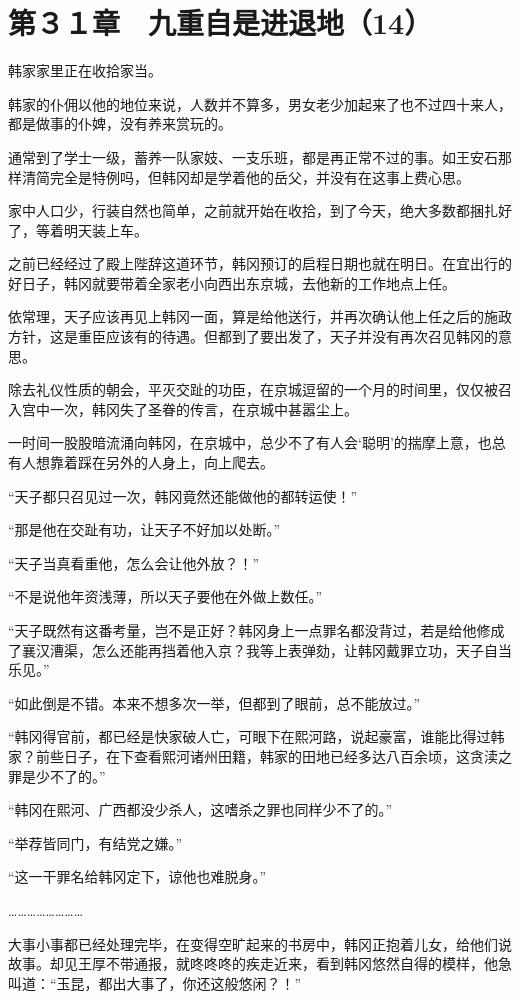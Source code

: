 \section{第３１章　九重自是进退地（14）}

韩家家里正在收拾家当。

韩家的仆佣以他的地位来说，人数并不算多，男女老少加起来了也不过四十来人，都是做事的仆婢，没有养来赏玩的。

通常到了学士一级，蓄养一队家妓、一支乐班，都是再正常不过的事。如王安石那样清简完全是特例吗，但韩冈却是学着他的岳父，并没有在这事上费心思。

家中人口少，行装自然也简单，之前就开始在收拾，到了今天，绝大多数都捆扎好了，等着明天装上车。

之前已经经过了殿上陛辞这道环节，韩冈预订的启程日期也就在明日。在宜出行的好日子，韩冈就要带着全家老小向西出东京城，去他新的工作地点上任。

依常理，天子应该再见上韩冈一面，算是给他送行，并再次确认他上任之后的施政方针，这是重臣应该有的待遇。但都到了要出发了，天子并没有再次召见韩冈的意思。

除去礼仪性质的朝会，平灭交趾的功臣，在京城逗留的一个月的时间里，仅仅被召入宫中一次，韩冈失了圣眷的传言，在京城中甚嚣尘上。

一时间一股股暗流涌向韩冈，在京城中，总少不了有人会‘聪明’的揣摩上意，也总有人想靠着踩在另外的人身上，向上爬去。

“天子都只召见过一次，韩冈竟然还能做他的都转运使！”

“那是他在交趾有功，让天子不好加以处断。”

“天子当真看重他，怎么会让他外放？！”

“不是说他年资浅薄，所以天子要他在外做上数任。”

“天子既然有这番考量，岂不是正好？韩冈身上一点罪名都没背过，若是给他修成了襄汉漕渠，怎么还能再挡着他入京？我等上表弹劾，让韩冈戴罪立功，天子自当乐见。”

“如此倒是不错。本来不想多次一举，但都到了眼前，总不能放过。”

“韩冈得官前，都已经是快家破人亡，可眼下在熙河路，说起豪富，谁能比得过韩家？前些日子，在下查看熙河诸州田籍，韩家的田地已经多达八百余顷，这贪渎之罪是少不了的。”

“韩冈在熙河、广西都没少杀人，这嗜杀之罪也同样少不了的。”

“举荐皆同门，有结党之嫌。”

“这一干罪名给韩冈定下，谅他也难脱身。”

……………………

大事小事都已经处理完毕，在变得空旷起来的书房中，韩冈正抱着儿女，给他们说故事。却见王厚不带通报，就咚咚咚的疾走近来，看到韩冈悠然自得的模样，他急叫道：“玉昆，都出大事了，你还这般悠闲？！”

